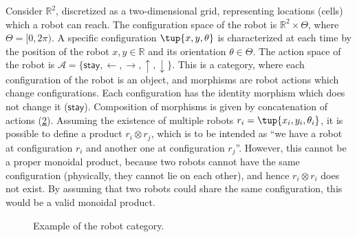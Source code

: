 \begin{example}
\begin{figure}[h!]
\begin{center}
\end{center}
\caption{\label{fig:monoidal_set_unit_nat}}
\end{figure}
\end{example}


\begin{example}
\label{ex:robot}
Consider $\mathbb{R}^2$, discretized as a two-dimensional grid, representing locations (cells) which a robot can reach. The configuration space of the robot is $\mathbb{R}^2\times \Theta$, where $\Theta=[0,2\pi)$. A specific configuration $\tup{x,y,\theta}$ is characterized at each time by the position of the robot $x,y\in \mathbb{R}$ and its orientation $\theta \in \Theta$. The action space of the robot is $\mathcal{A}=\{\mathsf{stay},\leftarrow, \rightarrow, \uparrow, \downarrow\}$. This is a category, where each configuration of the robot is an object, and morphisms are robot actions which change configurations. Each configuration has the identity morphism which does not change it ($\mathsf{stay}$). Composition of morphisms is given by concatenation of actions (\cref{fig:robotcategory}). Assuming the existence of multiple robots $r_i=\tup{x_i,y_i,\theta_i}$, it is possible to define a product $r_i\otimes r_j$, which is to be intended as ``we have a robot at configuration $r_i$ and another one at configuration $r_j$''. However, this cannot be a proper monoidal product, because two robots cannot have the same configuration (physically, they cannot lie on each other), and hence $r_i\otimes r_i$ does not exist. By assuming that two robots could share the same configuration, this would be a valid monoidal product.
\begin{figure}[tbh]
\begin{center}
\end{center}
\caption{Example of the robot category. \label{fig:robotcategory}}
\end{figure}
\end{example}


